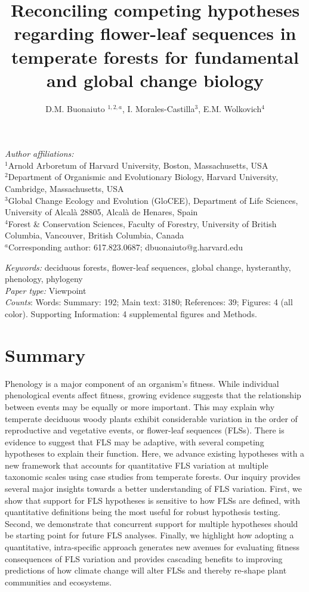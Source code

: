 \documentclass[11pt]{article}
\title{Reconciling competing hypotheses regarding flower-leaf sequences in temperate forests for fundamental and global change biology}
\date{}
\author{D.M. Buonaiuto $^{1,2,a}$, I. Morales-Castilla$^{3}$, E.M. Wolkovich$^{4}$}
\begin{document}
\maketitle
\linenumbers
\noindent \emph{Author affiliations:}\\
\noindent $^1$Arnold Arboretum of Harvard University, Boston, Massachusetts, USA\\
$^2$Department of Organismic and Evolutionary Biology, Harvard University, Cambridge, Massachusetts, USA\\
$^3$Global Change Ecology and Evolution (GloCEE), Department of Life Sciences, University of Alcal\`a  28805, Alcal\`a de Henares, Spain\\
$^4$Forest \& Conservation Sciences, Faculty of Forestry, University of British Columbia, Vancouver, British Columbia, Canada\\
$^a$Corresponding author: 617.823.0687; dbuonaiuto@g.harvard.edu

\noindent \emph{Keywords:} deciduous forests, flower-leaf sequences, global change, hysteranthy, phenology, phylogeny \\ %
\emph{Paper type:} Viewpoint\\
 \emph{Counts}: Words: Summary: 192; Main text: 3180; References: 39;  Figures: 4 (all color). Supporting Information: 4 supplemental figures and Methods.
\newpage

\section*{Summary}
Phenology is a major component of an organism's fitness. While individual phenological events affect fitness, growing evidence suggests that the relationship between events may be equally or more important. This may explain why temperate deciduous woody plants exhibit considerable variation in the order of reproductive and vegetative events, or flower-leaf sequences (FLSs). There is evidence to suggest that FLS may be adaptive, with several competing hypotheses to explain their function. Here, we advance existing hypotheses with a new framework that accounts for quantitative FLS variation at multiple taxonomic scales using case studies from temperate forests. Our inquiry provides several major insights towards a better understanding of FLS variation. First, we show that support for FLS hypotheses is sensitive to how FLSs are defined, with quantitative definitions being the most useful for robust hypothesis testing. Second, we demonstrate that concurrent support for multiple hypotheses should be starting point for future FLS analyses. Finally, we highlight how adopting a quantitative, intra-specific approach generates new avenues for evaluating fitness consequences of FLS variation and provides cascading benefits to improving predictions of how climate change will alter FLSs and thereby re-shape plant communities and ecosystems.
\end{document}
